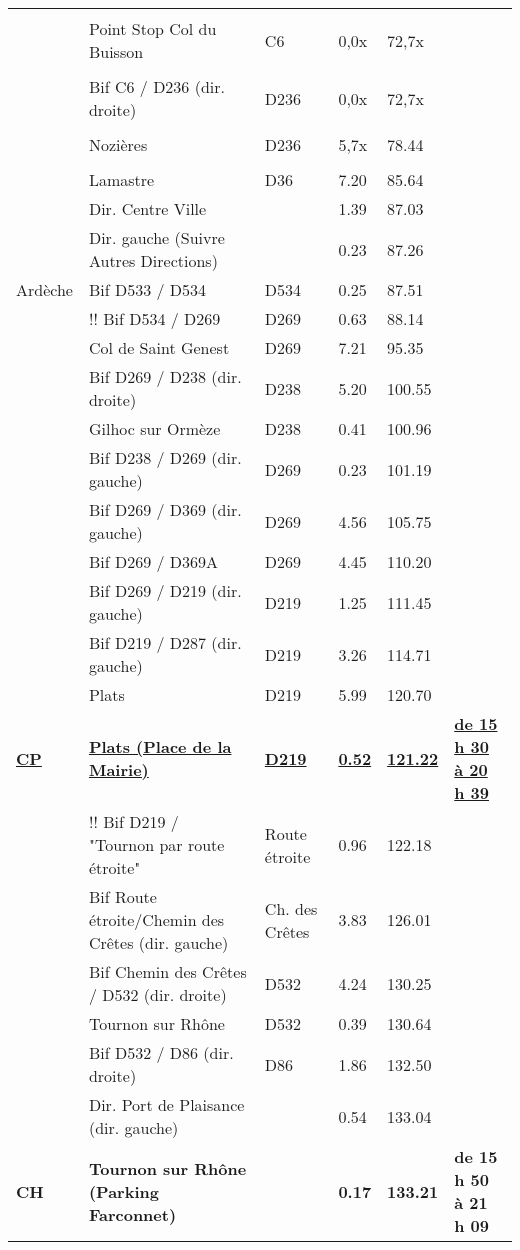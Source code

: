 \documentclass{article}%
\begin{document}
\begin{longtable}{p{2.25cm}|p{6.7cm}|p{2.0cm}|p{1.5cm}|p{1.5cm}|p{3.5cm}}
 & & & & & \\%
 &Point Stop Col du Buisson&C6&0,0x&72,7x& \\%
 & & & & & \\%
 &Bif C6 / D236 (dir. droite)&D236&0,0x&72,7x& \\%
 & & & & & \\%
 &Nozières&D236&5,7x&78.44& \\%
 & & & & & \\%
 &Lamastre &D36&7.20&85.64& \\%
 &Dir. Centre Ville& &1.39&87.03& \\%
 &Dir. gauche (Suivre Autres Directions)& &0.23&87.26& \\%
Ardèche&Bif D533 / D534&D534&0.25&87.51& \\%
 &!! Bif D534 / D269&D269 &0.63&88.14& \\%
 &Col de Saint Genest&D269&7.21&95.35& \\%
 &Bif D269 / D238 (dir. droite)&D238&5.20&100.55& \\%
 &Gilhoc sur Ormèze&D238&0.41&100.96& \\%
 &Bif D238 / D269 (dir. gauche)&D269&0.23&101.19& \\%
 &Bif D269 / D369 (dir. gauche)&D269&4.56&105.75& \\%
 &Bif D269 / D369A&D269&4.45&110.20& \\%
 &Bif D269 / D219 (dir. gauche)&D219&1.25&111.45& \\%
 &Bif D219 / D287 (dir. gauche)&D219&3.26&114.71& \\%
 &Plats&D219&5.99&120.70& \\%
\textbf{\underline{CP}}&\textbf{\underline{Plats (Place de la Mairie) }}&\textbf{\underline{D219}}&\textbf{\underline{0.52}}&\textbf{\underline{121.22}}&\textbf{\underline{de 15 h 30 à 20 h 39}}\\%
 &!! Bif D219 / "Tournon par route étroite"&Route étroite&0.96&122.18& \\%
 &Bif Route étroite/Chemin des Crêtes (dir. gauche)&Ch. des Crêtes&3.83&126.01& \\%
 &Bif Chemin des Crêtes / D532  (dir. droite)&D532&4.24&130.25& \\%
 &Tournon sur Rhône &D532&0.39&130.64& \\%
 &Bif D532 / D86 (dir. droite)&D86&1.86&132.50& \\%
 &Dir. Port de Plaisance (dir. gauche)& &0.54&133.04& \\%
\textbf{CH}&\textbf{Tournon sur Rhône (Parking Farconnet)}& &\textbf{0.17}&\textbf{133.21}&\textbf{de 15 h 50 à 21 h 09}\\%
\hline%
\end{longtable}%
\end{document}
